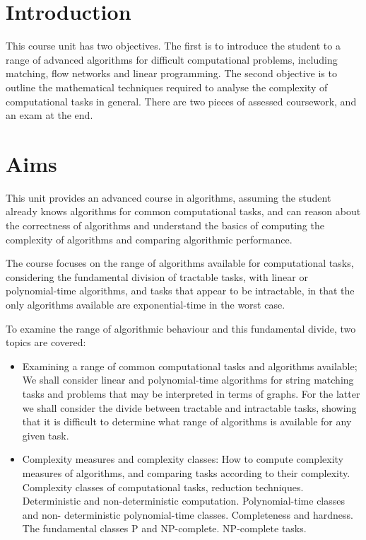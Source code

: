 \section*{Introduction}

This course unit has two objectives. The first is to introduce the student to a
range of advanced algorithms for difficult computational problems, including
matching, flow networks and linear programming. The second objective is to
outline the mathematical techniques required to analyse the complexity of
computational tasks in general. There are two pieces of assessed coursework, and
an exam at the end.

\section*{Aims}
This unit provides an advanced course in algorithms, assuming the student
already knows algorithms for common computational tasks, and can reason about
the correctness of algorithms and understand the basics of computing the
complexity of algorithms and comparing algorithmic performance.

The course focuses on the range of algorithms available for computational tasks,
considering the fundamental division of tractable tasks, with linear or
polynomial-time algorithms, and tasks that appear to be intractable, in that the
only algorithms available are exponential-time in the worst case.

To examine the range of algorithmic behaviour and this fundamental divide, two
topics are covered:

\begin{itemize}

  \item Examining a range of common computational tasks and algorithms available;
  We shall consider linear and polynomial-time algorithms for string matching
  tasks and problems that may be interpreted in terms of graphs. For the latter
  we shall consider the divide between tractable and intractable tasks, showing
  that it is difficult to determine what range of algorithms is available for
  any given task.

  \item Complexity measures and complexity classes: How to compute complexity
  measures of algorithms, and comparing tasks according to their complexity.
  Complexity classes of computational tasks, reduction techniques. Deterministic
  and non-deterministic computation. Polynomial-time classes and non-
  deterministic polynomial-time classes. Completeness and hardness. The
  fundamental classes P and NP-complete. NP-complete tasks.

\end{itemize}

